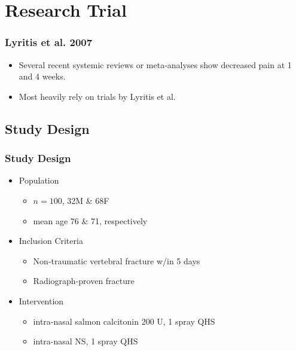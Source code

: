 \documentclass{beamer}
\begin{document}
\section{Research Trial}
	\begin{frame}
		\frametitle{Lyritis et al. 2007}
			\begin{itemize}
				\item Several recent systemic reviews or meta-analyses show decreased pain at 1 and 4 weeks.
				\item Most heavily rely on trials by Lyritis et al.
			\end{itemize}
	\end{frame}
\subsection{Study Design}
\begin{frame}
	\frametitle{Study Design}
	\begin{itemize}
		\item Population
		\begin{itemize}
			\item $n=100$, 32M \& 68F
			\item mean age 76 \& 71, respectively			
		\end{itemize}
		\item Inclusion Criteria
		\begin{itemize}
			\item Non-traumatic vertebral fracture w/in 5 days
			\item Radiograph-proven fracture
		\end{itemize}
	\item Intervention
		\begin{itemize}
			\item intra-nasal salmon calcitonin 200 U, 1 spray QHS
			\item intra-nasal NS, 1 spray QHS
		\end{itemize}
	\end{itemize}
\end{frame}
\end{document}
